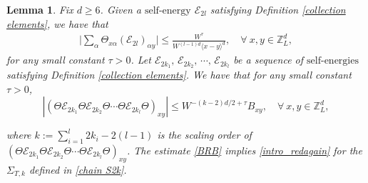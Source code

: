 \documentclass{article}
\newcommand{\1}{\mathds{1}}
\numberwithin{equation}{section}
\newcommand{\al}{\alpha}
\newcommand{\be}{\begin{equation}}
\newcommand{\ee}{\end{equation}}
\renewcommand{\leq}{\leqslant}
\renewcommand{\geq}{\geqslant}
\renewcommand{\le}{\leq}
\renewcommand{\ge}{\geq}
\newcommand{\Z}{\mathbb{Z}}
\newcommand{\self}{\text{self-energy}}
\newcommand{\selfs}{\text{self-energies}}
\theoremstyle{plain} %
\newtheorem{lemma}[theorem]{Lemma}
\theoremstyle{remark}
\newcommand{\Sdelta}{{\Sigma}_T}
\newcommand{\Sdeltak}{{\Sigma}_{T,k}}
\newcommand{\Sele}{{\mathcal E}}
\newcommand{\Selek}{{\mathcal E}}
\newcommand{\Cele}{{\mathscr E}}
\begin{document}
 \begin{lemma}\label{lem redundantagain}
Fix $d\ge 6$. Given a $\self$ $\Selek_{2l} $ satisfying Definition \ref{collection elements}, we have that 
 \begin{align}\label{redundant again}
\Big| \sum_{\al}\Theta_{x \al} (\Selek_{2l})_{\al y}\Big| \le \frac{W^\tau}{W^{(l-1)d}\langle x-y\rangle^d },\quad \forall \ x,y \in \Z_L^d ,
\end{align}
for any small constant $\tau>0$. Let $\Sele_{2k_1}, \, \Sele_{2k_2},\, \cdots , \, \Sele_{2k_l} $ be a sequence of $\selfs$ satisfying Definition \ref{collection elements}. We have that for any small constant $\tau>0$,
\be\label{BRB} 
\left|\left(\Theta \Sele_{2k_1}\Theta  \Sele_{2k_2}\Theta \cdots \Theta  \Sele_{2k_l}\Theta\right)_{xy}\right|\le W^{-(k-2)d/2+\tau}B_{xy}  , \quad \forall \ x,y \in \Z_L^d , \ee

where $k:=\sum_{i=1}^l  2k_i -2(l-1)$ is the scaling order of $\left(\Theta \Sele_{2k_1}\Theta  \Sele_{2k_2}\Theta \cdots \Theta  \Sele_{2k_l}\Theta\right)_{xy}$. The estimate \eqref{BRB} implies \eqref{intro_redagain} for the $\Sdeltak$ defined in \eqref{chain S2k}. 

 \end{lemma}
\end{document}

